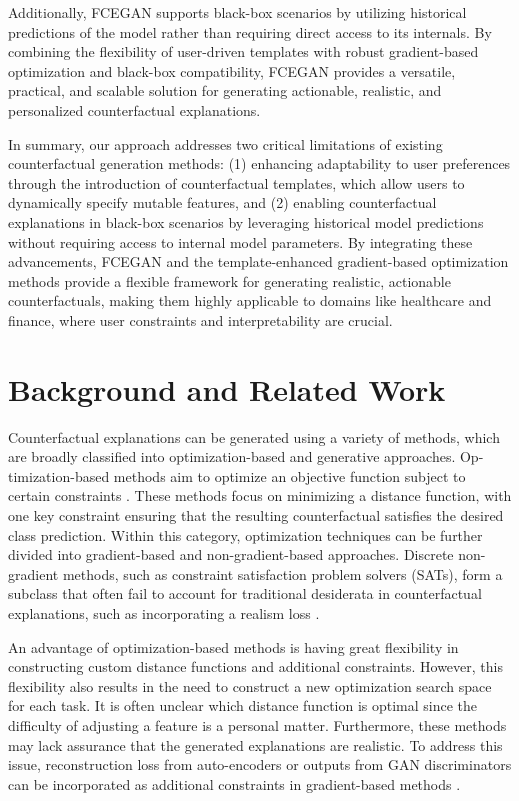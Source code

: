 \documentclass[runningheads]{llncs}
\begin{document}
Additionally, FCEGAN supports black-box scenarios by utilizing historical predictions of the model rather than requiring direct access to its internals. By combining the flexibility of user-driven templates with robust gradient-based optimization and black-box compatibility, FCEGAN provides a versatile, practical, and scalable solution for generating actionable, realistic, and personalized counterfactual explanations.

In summary, our approach addresses two critical limitations of existing counterfactual generation methods: (1) enhancing adaptability to user preferences through the introduction of counterfactual templates, which allow users to dynamically specify mutable features, and (2) enabling counterfactual explanations in black-box scenarios by leveraging historical model predictions without requiring access to internal model parameters. By integrating these advancements, FCEGAN and the template-enhanced gradient-based optimization methods provide a flexible framework for generating realistic, actionable counterfactuals, making them highly applicable to domains like healthcare and finance, where user constraints and interpretability are crucial.

\section{Background and Related Work}
Counterfactual explanations can be generated using a variety of methods, which are broadly classified into optimization-based and generative approaches. Op-timization-based methods aim to optimize an objective function subject to certain constraints \cite{poyiadzi2020face,ustun2019actionable,joshi2019towards,mothilal2020explaining,karimi2020model}. These methods focus on minimizing a distance function, with one key constraint ensuring that the resulting counterfactual satisfies the desired class prediction. Within this category, optimization techniques can be further divided into gradient-based and non-gradient-based approaches. Discrete non-gradient methods, such as constraint satisfaction problem solvers (SATs), form a subclass that often fail to account for traditional desiderata in counterfactual explanations, such as incorporating a realism loss \cite{barzekar2023achievable,rasouli2024care,salimi2023towards}.

 An advantage of optimization-based methods is having great flexibility in constructing custom distance functions and additional constraints. However, this flexibility also results in the need to construct a new optimization search space for each task. It is often unclear which distance function is optimal since the difficulty of adjusting a feature is a personal matter. Furthermore, these methods may lack assurance that the generated explanations are realistic. To address this issue, reconstruction loss from auto-encoders or outputs from GAN discriminators can be incorporated as additional constraints in gradient-based methods \cite{joshi2019towards,van2021interpretable}. 
 
\end{document}
